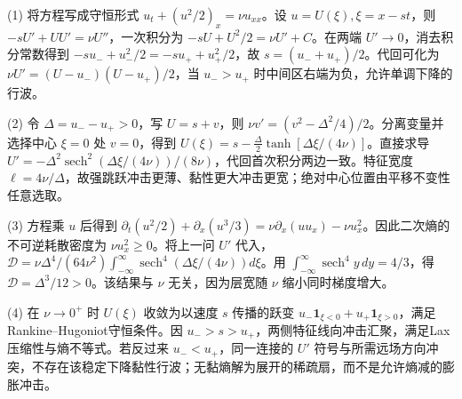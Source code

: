 (1) 将方程写成守恒形式 \(u_t+(u^2/2)_x=\nu u_{xx}\)。设 \(u=U(\xi),\xi=x-st\)，则 \(-sU'+UU'=\nu U''\)，一次积分为 \(-sU+U^2/2=\nu U'+C\)。在两端 \(U'\to0\)，消去积分常数得到 \(-su_-+u_-^2/2=-su_++u_+^2/2\)，故 \(\boxed{s=(u_-+u_+)/2}\)。代回可化为 \(\nu U'=(U-u_-)(U-u_+)/2\)，当 \(u_->u_+\) 时中间区右端为负，允许单调下降的行波。

(2) 令 \(\Delta=u_--u_+>0\)，写 \(U=s+v\)，则 \(\nu v'=(v^2-\Delta^2/4)/2\)。分离变量并选择中心 \(\xi=0\) 处 \(v=0\)，得到 \(\boxed{U(\xi)=s-\frac{\Delta}{2}\tanh[\Delta\xi/(4\nu)]}\)。直接求导 \(U'=-\Delta^2\operatorname{sech}^2(\Delta\xi/(4\nu))/(8\nu)\)，代回首次积分两边一致。特征宽度 \(\ell=4\nu/\Delta\)，故强跳跃冲击更薄、黏性更大冲击更宽；绝对中心位置由平移不变性任意选取。

(3) 方程乘 \(u\) 后得到 \(\partial_t(u^2/2)+\partial_x(u^3/3)=\nu\partial_x(uu_x)-\nu u_x^2\)。因此二次熵的不可逆耗散密度为 \(\nu u_x^2\ge0\)。将上一问 \(U'\) 代入，\(\mathcal D=\nu\Delta^4/(64\nu^2)\int_{-\infty}^\infty\operatorname{sech}^4(\Delta\xi/(4\nu))d\xi\)。用 \(\int_{-\infty}^\infty\operatorname{sech}^4y\,dy=4/3\)，得 \(\boxed{\mathcal D=\Delta^3/12>0}\)。该结果与 \(\nu\) 无关，因为层宽随 \(\nu\) 缩小同时梯度增大。

(4) 在 \(\nu\to0^+\) 时 \(U(\xi)\) 收敛为以速度 \(s\) 传播的跃变 \(u_-\mathbf1_{\xi<0}+u_+\mathbf1_{\xi>0}\)，满足Rankine–Hugoniot守恒条件。因 \(u_->s>u_+\)，两侧特征线向冲击汇聚，满足Lax压缩性与熵不等式。若反过来 \(u_-<u_+\)，同一连接的 \(U'\) 符号与所需远场方向冲突，不存在该稳定下降黏性行波；无黏熵解为展开的稀疏扇，而不是允许熵减的膨胀冲击。
